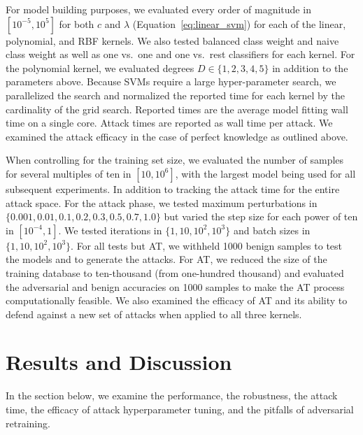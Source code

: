 \documentclass[runningheads]{llncs}
\begin{document}
For model building purposes, we evaluated every order of magnitude in $[10^{-5}, 10^5]$ for both $c$  and $\lambda$ (Equation~\ref{eq:linear_svm}) for each of the linear, polynomial, and RBF kernels. We also tested balanced class weight and naive class weight as well as one vs.~one and one vs.~rest classifiers for each kernel. For the polynomial kernel, we evaluated degrees $D\in\{1,2,3,4,5\}$ in addition to the parameters above. Because SVMs require a large hyper-parameter search, we parallelized the search and normalized the reported time for each kernel by the cardinality of the grid search. Reported times are the average model fitting  wall time on a single core. Attack times are reported as wall time per attack. We examined the attack efficacy in the case of perfect knowledge as outlined above.


When controlling for the training set size, we evaluated the number of samples for several multiples of ten in $[10, 10^6]$, with the largest model being used for all subsequent experiments.  In addition to tracking the attack time for the entire attack space. For the attack phase, we tested maximum perturbations in $\{0.001, 0.01, 0.1, 0.2, 0.3, 0.5, 0.7, 1.0\}$  but varied the step size for each power of ten in $[10^{-4}, 1]$. We tested iterations in $\{1, 10, 10^2, 10^3\}$ and batch sizes in $\{1, 10, 10^2, 10^3\}$. For all tests but AT, we withheld 1000 benign samples to test the models and to generate the attacks. For AT, we reduced the size of the training database to ten-thousand (from one-hundred thousand) and evaluated the adversarial and benign accuracies on 1000 samples to make the AT process computationally feasible.  We also examined the efficacy of AT and its ability to defend against a new set of attacks when applied to all three kernels. 



\section{Results and Discussion}

In the section below, we examine the performance, the robustness, the attack time, the efficacy of attack hyperparameter tuning, and the pitfalls of adversarial retraining.
\end{document}
